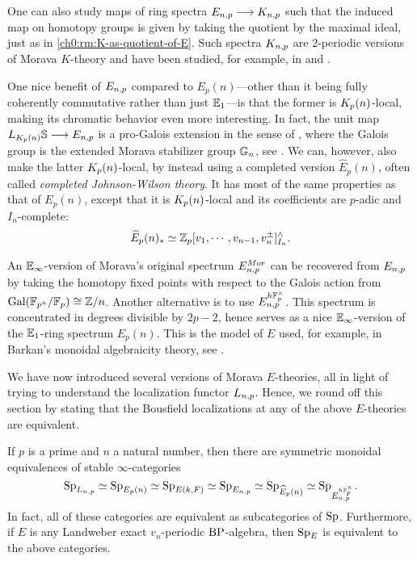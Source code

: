 \begin{remark}
    One can also study maps of ring spectra $E_{n,p} \longrightarrow K_{n,p}$ such that the induced map on homotopy groups is given by taking the quotient by the maximal ideal, just as in \cref{ch0:rm:K-as-quotient-of-E}. Such spectra $K_{n,p}$ are $2$-periodic versions of Morava $K$-theory and have been studied, for example, in \cite{hopkins-lurie_17} and \cite{barthel-pstragowski_2021}. 
\end{remark}

\begin{remark}
    One nice benefit of $E_{n,p}$ compared to $E_p(n)$---other than it being fully coherently commutative rather than just $\mathbb{E}_1$---is that the former is ${K_p(n)}$-local, making its chromatic behavior even more interesting. In fact, the unit map $L_{{K_p(n)}}\mathbb{S} \longrightarrow E_{n,p}$ is a pro-Galois extension in the sense of \cite{rognes_08}, where the Galois group is the extended Morava stabilizer group $\mathbb{G}_n$, see \cite{devinatz-hopkins_2004}. We can, however, also make the latter ${K_p(n)}$-local, by instead using a completed version $\widehat{E}_p(n)$, often called \emph{completed Johnson-Wilson theory}. It has most of the same properties as that of $E_p(n)$, except that it is ${K_p(n)}$-local and its coefficients are $p$-adic and $I_n$-complete: 
    \[\widehat{E}_p(n)_* \simeq \mathbb{Z}_p[v_1, \cdots, v_{n-1}, v_n^{\pm}]^\wedge_{I_n}.\]
\end{remark}

\begin{remark}
    An $\mathbb{E}_\infty$-version of Morava's original spectrum $E_{n,p}^{Mor}$ can be recovered from $E_{n,p}$ by taking the homotopy fixed points with respect to the Galois action from $\mathrm{Gal}(\mathbb{F}_{p^n}/\mathbb{F}_p)\cong \mathbb{Z}/n$. Another alternative is to use $E_{n,p}^{h\mathbb{F}_p^\times}$. This spectrum is concentrated in degrees divisible by $2p-2$, hence serves as a nice $\mathbb{E}_\infty$-version of the $\mathbb{E}_1$-ring spectrum $E_p(n)$. This is the model of $E$ used, for example, in Barkan's monoidal algebraicity theory, see \cite{barkan_2023}. 
\end{remark}

We have now introduced several versions of Morava $E$-theories, all in light of trying to understand the localization functor $L_{n,p}$. Hence, we round off this section by stating that the Bousfield localizations at any of the above $E$-theories are equivalent. 

\begin{proposition}
    \label{ch0:prop:all-E-local-cats-are-equivalent}
    If $p$ is a prime and $n$ a natural number, then there are symmetric monoidal equivalences of stable $\infty$-categories 
    \[\mathrm{Sp}_{L_{n,p}} \simeq \mathrm{Sp}_{E_p(n)} \simeq \mathrm{Sp}_{E(k,F)}\simeq \mathrm{Sp}_{E_{n,p}} \simeq \mathrm{Sp}_{\widehat{E}_p(n)}\simeq \mathrm{Sp}_{E_{n,p}^{h\mathbb{F}_p^\times}}.\]
    In fact, all of these categories are equivalent as subcategories of $\mathrm{Sp}$. Furthermore, if $E$ is any Landweber exact $v_n$-periodic $\mathrm{BP}$-algebra, then $\mathrm{Sp}_E$ is equivalent to the above categories. 
\end{proposition}

